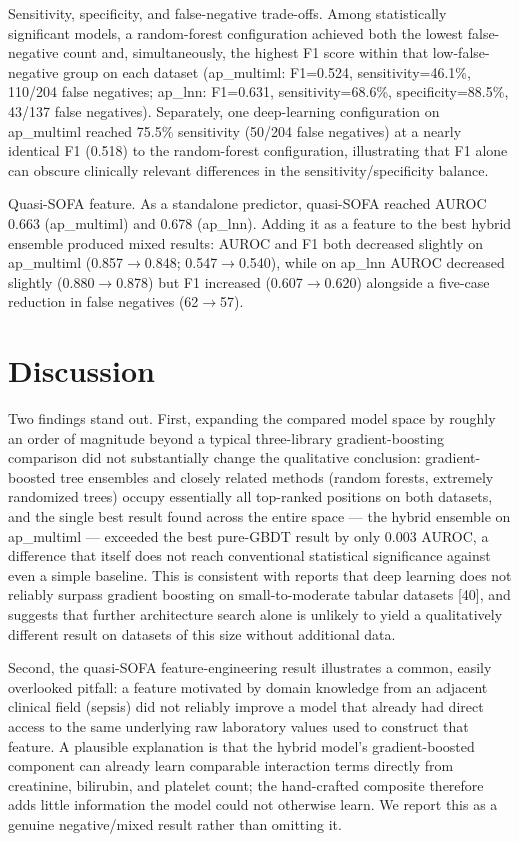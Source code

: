 \documentclass[twoside,11pt]{article}
\begin{document}
Sensitivity, specificity, and false-negative trade-offs. Among statistically significant models, a random-forest configuration achieved both the lowest false-negative count and, simultaneously, the highest F1 score within that low-false-negative group on each dataset (ap\_multiml: F1=0.524, sensitivity=46.1\%, 110/204 false negatives; ap\_lnn: F1=0.631, sensitivity=68.6\%, specificity=88.5\%, 43/137 false negatives). Separately, one deep-learning configuration on ap\_multiml reached 75.5\% sensitivity (50/204 false negatives) at a nearly identical F1 (0.518) to the random-forest configuration, illustrating that F1 alone can obscure clinically relevant differences in the sensitivity/specificity balance.

Quasi-SOFA feature. As a standalone predictor, quasi-SOFA reached AUROC 0.663 (ap\_multiml) and 0.678 (ap\_lnn). Adding it as a feature to the best hybrid ensemble produced mixed results: AUROC and F1 both decreased slightly on ap\_multiml (0.857$\to$0.848; 0.547$\to$0.540), while on ap\_lnn AUROC decreased slightly (0.880$\to$0.878) but F1 increased (0.607$\to$0.620) alongside a five-case reduction in false negatives (62$\to$57).

\section{Discussion}

Two findings stand out. First, expanding the compared model space by roughly an order of magnitude beyond a typical three-library gradient-boosting comparison did not substantially change the qualitative conclusion: gradient-boosted tree ensembles and closely related methods (random forests, extremely randomized trees) occupy essentially all top-ranked positions on both datasets, and the single best result found across the entire space --- the hybrid ensemble on ap\_multiml --- exceeded the best pure-GBDT result by only 0.003 AUROC, a difference that itself does not reach conventional statistical significance against even a simple baseline. This is consistent with reports that deep learning does not reliably surpass gradient boosting on small-to-moderate tabular datasets [40], and suggests that further architecture search alone is unlikely to yield a qualitatively different result on datasets of this size without additional data.

Second, the quasi-SOFA feature-engineering result illustrates a common, easily overlooked pitfall: a feature motivated by domain knowledge from an adjacent clinical field (sepsis) did not reliably improve a model that already had direct access to the same underlying raw laboratory values used to construct that feature. A plausible explanation is that the hybrid model's gradient-boosted component can already learn comparable interaction terms directly from creatinine, bilirubin, and platelet count; the hand-crafted composite therefore adds little information the model could not otherwise learn. We report this as a genuine negative/mixed result rather than omitting it.
\end{document}

